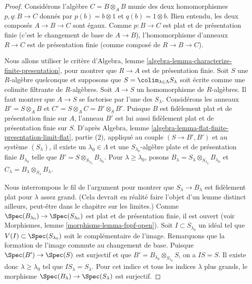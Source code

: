\begin{proof}
Considérons l'algèbre $C = B \otimes_A B$ munie des deux homomorphismes
$p, q : B \to C$ donnés par $p(b) = b \otimes 1$ et $q(b) = 1 \otimes b$.
Bien entendu, les deux composés $A \to B \to C$ sont égaux.
Comme $p : B \to C$ est plat et de présentation finie (c'est le changement de
base de $A \to B$), l'homomorphisme d'anneaux $R \to C$ est de présentation
finie (comme composé de $R \to B \to C$).

\medskip\noindent
Nous allons utiliser le critère d'Algebra, lemme
\ref{algebra-lemma-characterize-finite-presentation}, pour montrer que
$R \to A$ est de présentation finie.
Soit $S$ une $R$-algèbre quelconque et supposons que
$S = \colim_{\lambda \in \Lambda} S_\lambda$ soit écrite comme une colimite
filtrante de $R$-algèbres. Soit $A \to S$ un homomorphisme de $R$-algèbres.
Il faut montrer que $A \to S$ se factorise par l'une des $S_\lambda$.
Considérons les anneaux $B' = S \otimes_A B$ et
$C' = S \otimes_A C = B' \otimes_S B'$.
Puisque $B$ est fidèlement plat et de présentation finie sur $A$, l'anneau
$B'$ est lui aussi fidèlement plat et de présentation finie sur $S$.
D'après Algebra, lemme
\ref{algebra-lemma-flat-finite-presentation-limit-flat}, partie (2), appliqué
au couple $(S \to B', B')$ et au système $(S_\lambda)$, il existe un
$\lambda_0 \in \Lambda$ et une $S_{\lambda_0}$-algèbre plate et de présentation
finie $B_{\lambda_0}$ telle que
$B' = S \otimes_{S_{\lambda_0}} B_{\lambda_0}$.
Pour $\lambda \geq \lambda_0$, posons
$B_\lambda = S_\lambda \otimes_{S_{\lambda_0}} B_{\lambda_0}$ et
$C_\lambda = B_\lambda \otimes_{S_\lambda} B_\lambda$.

\medskip\noindent
Nous interrompons le fil de l'argument pour montrer que
$S_\lambda \to B_\lambda$ est fidèlement plat pour $\lambda$ assez grand.
(Cela devrait en réalité faire l'objet d'un lemme distinct ailleurs, peut-être
dans le chapitre sur les limites.)
Comme $\Spec(B_{\lambda_0}) \to \Spec(S_{\lambda_0})$ est plat et de
présentation finie, il est ouvert (voir Morphismes, lemme
\ref{morphisms-lemma-fppf-open}).
Soit $I \subset S_{\lambda_0}$ un idéal tel que
$V(I) \subset \Spec(S_{\lambda_0})$ soit le complémentaire de l'image.
Remarquons que la formation de l'image commute au changement de base.
Puisque $\Spec(B') \to \Spec(S)$ est surjectif et que
$B' = B_{\lambda_0} \otimes_{S_{\lambda_0}} S$, on a $IS = S$.
Il existe donc $\lambda \geq \lambda_0$ tel que
$IS_{\lambda} = S_\lambda$. Pour cet indice et tous les indices
$\lambda$ plus grands, le morphisme
$\Spec(B_\lambda) \to \Spec(S_\lambda)$ est surjectif.


\end{proof}
